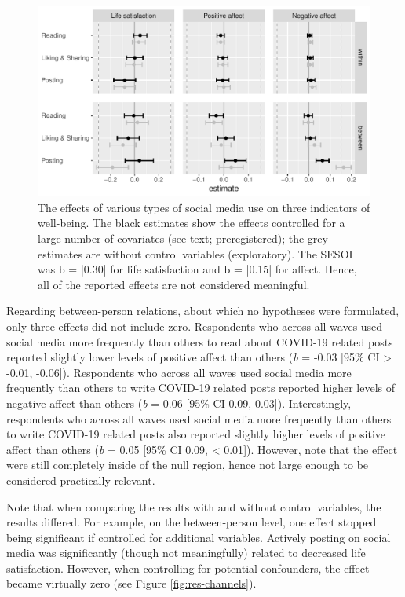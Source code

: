 \documentclass[
  english,
  man,mask,floatsintext]{apa6}
\begin{document}
\begin{figure}
\includegraphics[width=\textwidth]{figures/fig_results_activity} \caption{The effects of various types of social media use on three indicators of well-being. The black estimates show the effects controlled for a large number of covariates (see text; preregistered); the grey estimates are without control variables (exploratory). The SESOI was b = |0.30| for life satisfaction and b = |0.15| for affect. Hence, all of the reported effects are not considered meaningful.}\label{fig:res-activity}
\end{figure}

Regarding between-person relations, about which no hypotheses were formulated, only three effects did not include zero.
Respondents who across all waves used social media more frequently than others to read about COVID-19 related posts reported slightly lower levels of positive affect than others (\emph{b} = -0.03 {[}95\% CI \textgreater{} -0.01, -0.06{]}).
Respondents who across all waves used social media more frequently than others to write COVID-19 related posts reported higher levels of negative affect than others (\emph{b} = 0.06 {[}95\% CI 0.09, 0.03{]}).
Interestingly, respondents who across all waves used social media more frequently than others to write COVID-19 related posts also reported slightly higher levels of positive affect than others (\emph{b} = 0.05 {[}95\% CI 0.09, \textless{} 0.01{]}).
However, note that the effect were still completely inside of the null region, hence not large enough to be considered practically relevant.

Note that when comparing the results with and without control variables, the results differed.
For example, on the between-person level, one effect stopped being significant if controlled for additional variables.
Actively posting on social media was significantly (though not meaningfully) related to decreased life satisfaction.
However, when controlling for potential confounders, the effect became virtually zero (see Figure \ref{fig:res-channels}).
\end{document}
